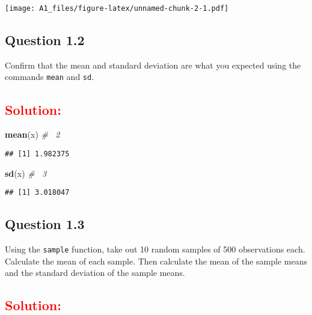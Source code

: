 \documentclass[]{article}
\newenvironment{Shaded}{\begin{snugshade}}{\end{snugshade}}
\newcommand{\KeywordTok}[1]{\textcolor[rgb]{0.13,0.29,0.53}{\textbf{#1}}}
\newcommand{\CommentTok}[1]{\textcolor[rgb]{0.56,0.35,0.01}{\textit{#1}}}
\newcommand{\NormalTok}[1]{#1}
\begin{document}
\texttt{[image: A1\_files/figure-latex/unnamed-chunk-2-1.pdf]}

\subsection{Question 1.2}\label{question-1.2}

Confirm that the mean and standard deviation are what you expected using
the commands \texttt{mean} and \texttt{sd}.

\subsection{\texorpdfstring{\textcolor{red}{Solution:}}{}}\label{section-2}

\begin{Shaded}
\begin{Highlighting}[]
\KeywordTok{mean}\NormalTok{(x) }\CommentTok{# ~2}
\end{Highlighting}
\end{Shaded}

\begin{verbatim}
## [1] 1.982375
\end{verbatim}

\begin{Shaded}
\begin{Highlighting}[]
\KeywordTok{sd}\NormalTok{(x)   }\CommentTok{# ~3}
\end{Highlighting}
\end{Shaded}

\begin{verbatim}
## [1] 3.018047
\end{verbatim}

\subsection{Question 1.3}\label{question-1.3}

Using the \texttt{sample} function, take out 10 random samples of 500
observations each. Calculate the mean of each sample. Then calculate the
mean of the sample means and the standard deviation of the sample means.

\subsection{\texorpdfstring{\textcolor{red}{Solution:}}{}}\label{section-3}
\end{document}
